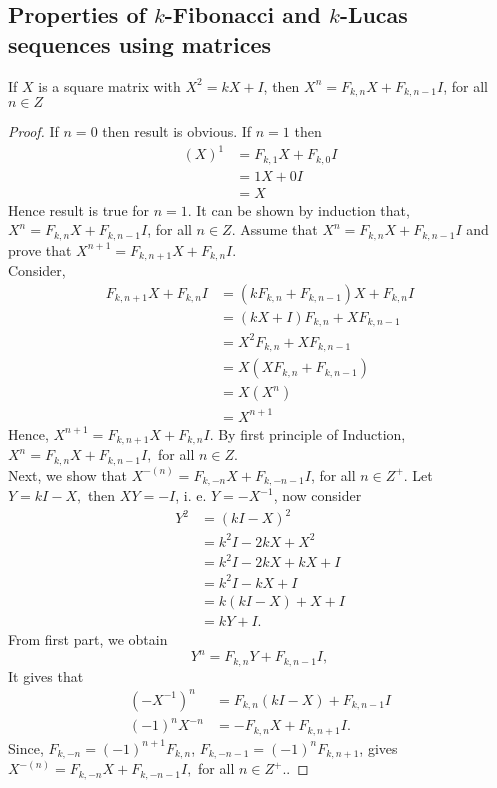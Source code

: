 \subsection{Properties of $k$-Fibonacci and $k$-Lucas sequences using matrices}

\begin{lemma} \label{3-l-1}
If $X$ is a square matrix with $X^2=kX+I$, then $ X^{n}=F_{k,n}X+F_{k,n-1}I$, for all $n\in Z$
\end{lemma}
\begin{proof}
If $n=0$ then result is obvious. If $n=1$ then
\begin{align*}
(X)^1&=F_{k,1}X+F_{k,0}I\\
		 &=1X+0I\\
		 &=X
\end{align*}		
Hence result is true for $n=1$. It can be shown by induction that,\\
$ X^{n}=F_{k,n}X+F_{k,n-1}I$, for all $n\in Z$.
Assume that $X^{n}=F_{k,n}X+F_{k,n-1}I$ and prove that $X^{n+1}=F_{k,n+1}X+F_{k,n}I$.\\
Consider,
\begin{align*}
F_{k,n+1}X+F_{k,n}I&=(kF_{k,n}+F_{k,n-1})X+F_{k,n}I\\
									 &=(kX+I)F_{k,n}+XF_{k,n-1}\\
									 &=X^2F_{k,n}+XF_{k,n-1}\\
									 &=X(XF_{k,n}+F_{k,n-1})\\
									 &=X(X^{n})\\
									 &=X^{n+1}
\end{align*}		
Hence, $X^{n+1}=F_{k,n+1}X+F_{k,n}I$.
By first principle of Induction,\\ $X^{n}=F_{k,n}X+F_{k,n-1}I,$ for all $n\in Z$.\\
Next, we show that $X^{-(n)}=F_{k,-n}X+F_{k,-n-1}I$, for all $n\in Z^{+}$.
Let $Y=kI-X,$ then $XY=-I$, i. e. $Y=-X^{-1}$, now consider
\begin{align*}
								Y^2&=(kI-X)^2\\
									 &=k^2I-2kX+X^2\\
									 &=k^2I-2kX+kX+I\\
									 &=k^2I-kX+I\\
									 &=k(kI-X)+X+I\\
									 &=kY+I.
									 \end{align*}	
From first part, we obtain $$Y^n=F_{k,n}Y+F_{k,n-1}I,$$
It gives that
	\begin{align*}	
	(-X^{-1})^n&=F_{k,n}(kI-X)+F_{k,n-1}I\\
			 (-1)^nX^{-n}&=-F_{k,n}X+F_{k,n+1}I.
\end{align*}	
Since, $F_{k,-n}=(-1)^{n+1}F_{k,n}$, $F_{k,-n-1}=(-1)^{n}F_{k,n+1}$, gives $ X^{-(n)}=F_{k,-n}X+F_{k,-n-1}I,$ for all $n\in Z^{+}.$.
\end{proof}
